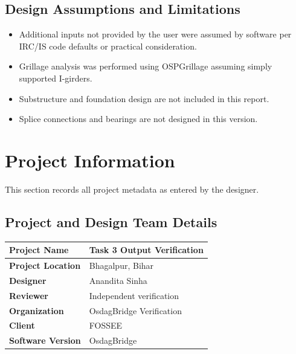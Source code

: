 \documentclass[12pt,a4paper]{report}
\numberwithin{table}{chapter}
\numberwithin{figure}{chapter}
\begin{document}
\section*{Design Assumptions and Limitations}
\label{sec:assumptions}

\begin{itemize}
\item Additional inputs not provided by the user were assumed by software per IRC/IS code defaults or practical consideration.
\item Grillage analysis was performed using OSPGrillage assuming simply supported I-girders.
\item Substructure and foundation design are not included in this report.
\item Splice connections and bearings are not designed in this version.
\end{itemize}

\titleformat{\chapter}[block]{\normalfont\Large\bfseries\centering}{\thechapter}{1em}{}
\titlespacing*{\chapter}{0pt}{-30pt}{10pt}


\chapter{Project Information}

This section records all project metadata as entered by the designer.

\section{Project and Design Team Details}
\label{sec:project-details}

\begin{tabular}{|L{5.5cm}|L{8.5cm}|}
\hline
\textbf{Project Name} & Task 3 Output Verification \\
\hline
\textbf{Project Location} & Bhagalpur, Bihar \\
\hline
\textbf{Designer} & Anandita Sinha \\
\hline
\textbf{Reviewer} & Independent verification \\
\hline
\textbf{Organization} & OsdagBridge Verification \\
\hline
\textbf{Client} & FOSSEE \\
\hline
\textbf{Software Version} & OsdagBridge \\
\hline
\end{tabular}
\end{document}
